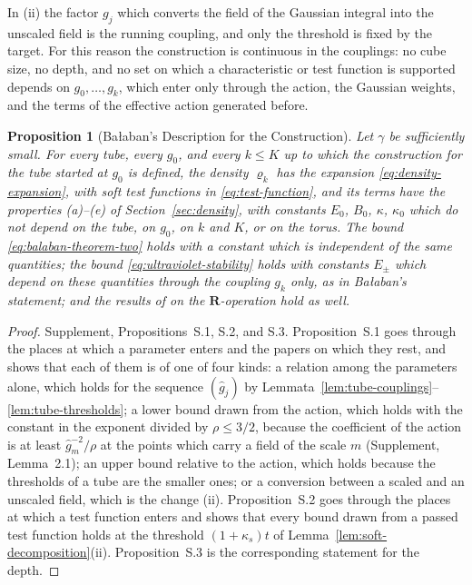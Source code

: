 \documentclass[11pt]{preprint}
\numberwithin{equation}{section}
\newtheorem{proposition}[theorem]{Proposition}
\theoremstyle{definition}
\theoremstyle{remark}
\theoremstyle{plain}
\begin{document}
In (ii) the factor $g_j$ which converts the field of the Gaussian integral into the unscaled field is the running coupling, and only the threshold is fixed by the target. For this reason the construction is continuous in the couplings: no cube size, no depth, and no set on which a characteristic or test function is supported depends on $g_0, \dots, g_k$, which enter only through the action, the Gaussian weights, and the terms of the effective action generated before.

\begin{proposition}[Ba{\l}aban's Description for the Construction]\label{prop:construction-admissible}
Let $\gamma$ be sufficiently small. For every tube, every $g_0$, and every $k \leq K$ up to which the construction for the tube started at $g_0$ is defined, the density $\varrho_k$ has the expansion \eqref{eq:density-expansion}, with soft test functions in \eqref{eq:test-function}, and its terms have the properties (a)--(e) of Section~\ref{sec:density}, with constants $E_0$, $B_0$, $\kappa$, $\kappa_0$ which do not depend on the tube, on $g_0$, on $k$ and $K$, or on the torus. The bound \eqref{eq:balaban-theorem-two} holds with a constant which is independent of the same quantities; the bound \eqref{eq:ultraviolet-stability} holds with constants $E_\pm$ which depend on these quantities through the coupling $g_k$ only, as in Ba{\l}aban's statement; and the results of \cite{BalabanLFR1,BalabanLFR2} on the $\mathbf R$-operation hold as well.
\end{proposition}

\begin{proof}
Supplement, Propositions~S.1, S.2, and S.3. Proposition~S.1 goes through the places at which a parameter enters \cite{BalabanCRE,BalabanLFR1,BalabanLFR2} and the papers on which they rest, and shows that each of them is of one of four kinds: a relation among the parameters alone, which holds for the sequence $(\hat g_j)$ by Lemmata~\ref{lem:tube-couplings}--\ref{lem:tube-thresholds}; a lower bound drawn from the action, which holds with the constant in the exponent divided by $\rho \leq 3/2$, because the coefficient of the action is at least $\hat g_m^{-2}/\rho$ at the points which carry a field of the scale $m$ (Supplement, Lemma~2.1); an upper bound relative to the action, which holds because the thresholds of a tube are the smaller ones; or a conversion between a scaled and an unscaled field, which is the change (ii). Proposition~S.2 goes through the places at which a test function enters and shows that every bound drawn from a passed test function holds at the threshold $(1 + \kappa_s)t$ of Lemma~\ref{lem:soft-decomposition}(ii). Proposition~S.3 is the corresponding statement for the depth.
\end{proof}
\end{document}
